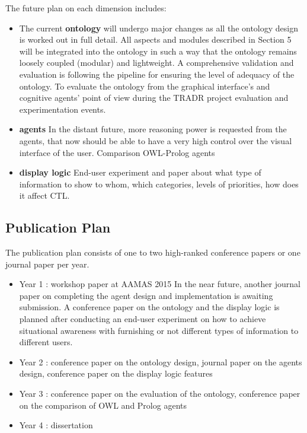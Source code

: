 The future plan on each dimension includes:
\begin{itemize}
\item The current \textbf{ontology} will undergo major changes as all the ontology design is worked out in full detail. All aspects and modules described in Section 5 will be integrated into the ontology in such a way that the ontology remains loosely coupled (modular) and lightweight. A comprehensive validation and evaluation is following the pipeline for ensuring the level of adequacy of the ontology. To evaluate the ontology from the graphical interface's and cognitive agents' point of view during the TRADR project evaluation and experimentation events.  
\item \textbf{agents} In the distant future, more reasoning power is requested from the agents, that now should be able to have a very high control over the visual interface of the user. 
Comparison OWL-Prolog agents
\item \textbf{display logic} End-user experiment and paper about what type of information to show to whom, which categories, levels of priorities, how does it affect CTL.
\end{itemize}

\subsection{Publication Plan}

The publication plan consists of one to two high-ranked conference papers or one journal paper per year. 
\begin{itemize}
\item Year 1 : workshop paper at AAMAS 2015
In the near future, another journal paper on completing the agent design and implementation is awaiting submission. A conference paper on the ontology and the display logic is planned after conducting an end-user experiment on how to achieve situational awareness with furnishing or not different types of information to different users.
\item Year 2 : conference paper on the ontology design, journal paper on the agents design, conference paper on the display logic features
\item Year 3 : conference paper on the evaluation of the ontology, conference paper on the comparison of OWL and Prolog agents
\item Year 4 : dissertation 
\end{itemize}

